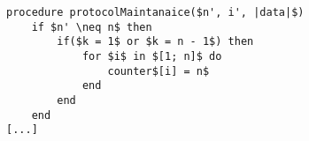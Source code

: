 \begin{lstlisting}[style=pseudocode, mathescape=true, float, label={lst:maintaniance1}, caption={Pseudocode additions to protocol maintaniance}, escapechar=\%] 
procedure protocolMaintanaice($n', i', |data|$)
	if $n' \neq n$ then
		if($k = 1$ or $k = n - 1$) then
			for $i$ in $[1; n]$ do
				counter$[i] = n$
			end
		end
	end
[...]
\end{lstlisting}  